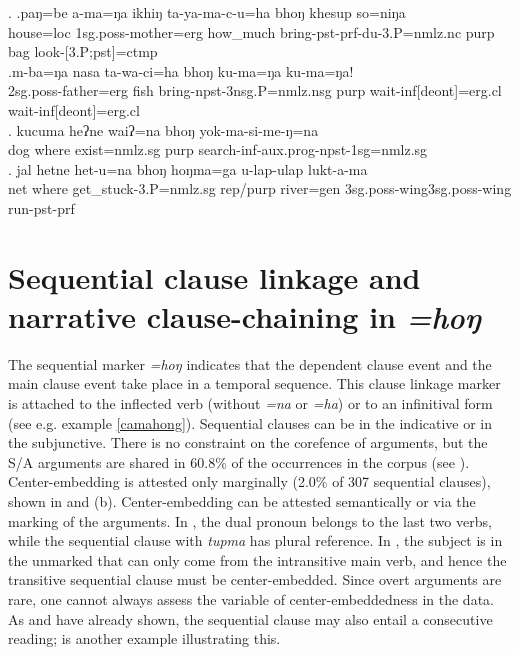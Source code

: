 	\ex. \ag.paŋ=be     a-ma=ŋa       ikhiŋ   ta-ya-ma-c-u=ha     bhoŋ khesup so=niŋa\\
	house{\sc =loc} {\sc 1sg.poss-}mother{\sc =erg} how\_much bring{\sc -pst-prf-du-3.P=nmlz.nc} {\sc purp} bag look{\sc -[3.P;pst]=ctmp}\\
	 
	\bg.m-ba=ŋa                nasa ta-wa-ci=ha                      bhoŋ ku-ma=ŋa                  ku-ma=ŋa!\\
{\sc 2sg.poss-}father{\sc =erg} fish bring{\sc -npst-3nsg.P=nmlz.nsg} {\sc purp}  wait{\sc -inf[deont]=erg.cl} wait{\sc -inf[deont]=erg.cl}\\
 
	\bg. kucuma heʔne waiʔ=na bhoŋ yok-ma-si-me-ŋ=na\\
	dog where exist{\sc [npst;3sg]=nmlz.sg} {\sc purp} search{\sc -inf-aux.prog-npst-1sg=nmlz.sg}\\
\bg. jal hetne het-u=na bhoŋ hoŋma=ga u-lap-ulap lukt-a-ma\\
net where get\_stuck{\sc -3.P=nmlz.sg} {\sc rep/purp} river{\sc =gen} {\sc 3sg.poss}-wing{\sc 3sg.poss}-wing run{\sc [3sg]-pst-prf}\\
  



\section{Sequential clause linkage and narrative clause-chaining in \emph{=hoŋ}}\label{adv-cl-seq}

The sequential marker \emph{=hoŋ}  indicates that the dependent clause event and the main clause event take place in a temporal sequence.  This clause linkage marker is attached to the  inflected verb (without \emph{=na} or \emph{=ha}) or to an infinitival form (see e.g. example \ref{camahong}). Sequential clauses can be in the indicative or in the subjunctive. There is no constraint on the corefence of arguments, but the S/A arguments are shared in 60.8\% of the occurrences in the corpus (see \Next). Center-embedding is attested only marginally (2.0\% of 307 sequential clauses), shown in \NNext[a] and (b). Center-embedding can be attested semantically or via the  marking of the arguments. In \NNext[a], the dual pronoun belongs to the last two verbs, while the sequential clause with \emph{tupma}  has plural reference. In \NNext[b], the subject is in the unmarked  that can only come from the intransitive main verb, and hence the transitive sequential clause must be center-embedded. Since overt arguments are rare, one cannot always assess the variable of center-embeddedness in the data. As \Next[b] and \NNext[b] have already shown, the sequential clause may also entail a consecutive reading; \NNext[c] is another example illustrating this.
	
